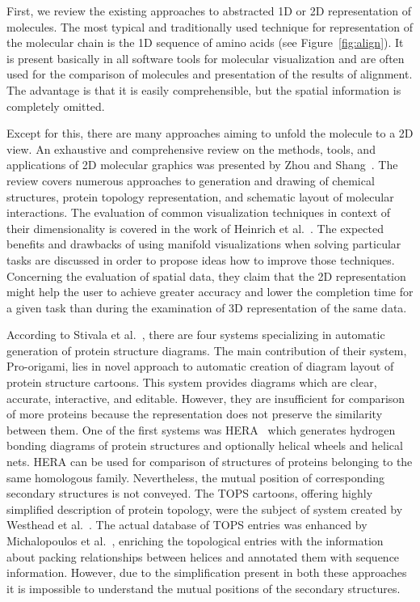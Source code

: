 \documentclass[twocolumn]{bmcart}%
\begin{document}
First, we review the existing approaches to abstracted 1D or 2D representation of molecules.
The most typical and traditionally used technique for representation of the molecular chain is the 1D sequence of amino acids (see Figure~\ref{fig:align}).
It is present basically in all software tools for molecular visualization and are often used for the comparison of molecules and presentation of the results of alignment.
The advantage is that it is easily comprehensible, but the spatial information is completely omitted.

Except for this, there are many approaches aiming to unfold the molecule to a 2D view.
An exhaustive and comprehensive review on the methods, tools, and applications of 2D molecular graphics was presented by Zhou and Shang~\cite{Zhou2009}. 
The review covers numerous approaches to generation and drawing of chemical structures, protein topology representation, and schematic layout of molecular interactions.
The evaluation of common visualization techniques in context of their dimensionality is covered in the work of Heinrich et al.~\cite{Heinrich2014}.
The expected benefits and drawbacks of using manifold visualizations when solving particular tasks are discussed in order to propose ideas how to improve those techniques.
Concerning the evaluation of spatial data, they claim that the 2D representation might help the user to achieve greater accuracy and lower the completion time for a given task than during the examination of 3D representation of the same data.

According to Stivala et al.~\cite{Stivala2011}, there are four systems specializing in automatic generation of protein structure diagrams.
The main contribution of their system, Pro-origami, lies in novel approach to automatic creation of diagram layout of protein structure cartoons.
This system provides diagrams which are clear, accurate, interactive, and editable.
However, they are insufficient for comparison of more proteins because the representation does not preserve the similarity between them.
One of the first systems was HERA~\cite{Hutchinson1990} which generates hydrogen bonding diagrams of protein structures and optionally helical wheels and helical nets.
HERA can be used for comparison of structures of proteins belonging to the same homologous family. 
Nevertheless, the mutual position of corresponding secondary structures is not conveyed.
The TOPS cartoons, offering highly simplified description of protein topology, were the subject of system created by Westhead et al.~\cite{Westhead1999}.
The actual database of TOPS entries was enhanced by Michalopoulos et al.~\cite{Michalopoulos2004}, enriching the topological entries with the information about packing relationships between helices and annotated them with sequence information.
However, due to the simplification present in both these approaches it is impossible to understand the mutual positions of the secondary structures.
\end{document}
